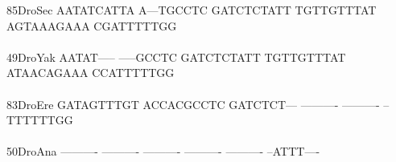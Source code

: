\documentclass[11pt,twoside,reqno,a4paper]{article}
\begin{document}
{85\hspace*{2\charwidth}DroSec	AATATCATTA	A---TGCCTC	GATCTCTATT	TGTTGTTTAT	AGTAAAGAAA	CGATTTTTGG	\\
\hspace*{4\charwidth}\hspace*{7\charwidth}\hspace*{1\charwidth}\hspace*{1\charwidth}\hspace*{1\charwidth}\hspace*{1\charwidth}\hspace*{1\charwidth}\hspace*{1\charwidth}\\
49\hspace*{2\charwidth}DroYak	AATAT-----	-----GCCTC	GATCTCTATT	TGTTGTTTAT	ATAACAGAAA	CCATTTTTGG	\\
\hspace*{4\charwidth}\hspace*{7\charwidth}\hspace*{1\charwidth}\hspace*{1\charwidth}\hspace*{1\charwidth}\hspace*{1\charwidth}\hspace*{1\charwidth}\hspace*{1\charwidth}\\
83\hspace*{2\charwidth}DroEre	GATAGTTTGT	ACCACGCCTC	GATCTCT---	----------	----------	--TTTTTTGG	\\
\hspace*{4\charwidth}\hspace*{7\charwidth}\hspace*{1\charwidth}\hspace*{1\charwidth}\hspace*{1\charwidth}\hspace*{1\charwidth}\hspace*{1\charwidth}\hspace*{1\charwidth}\\
50\hspace*{2\charwidth}DroAna	----------	----------	----------	----------	----------	--ATTT----	\\
\hspace*{4\charwidth}\hspace*{7\charwidth}\hspace*{1\charwidth}\hspace*{1\charwidth}\hspace*{1\charwidth}\hspace*{1\charwidth}\hspace*{1\charwidth}\hspace*{1\charwidth}\\
}
\end{document}
